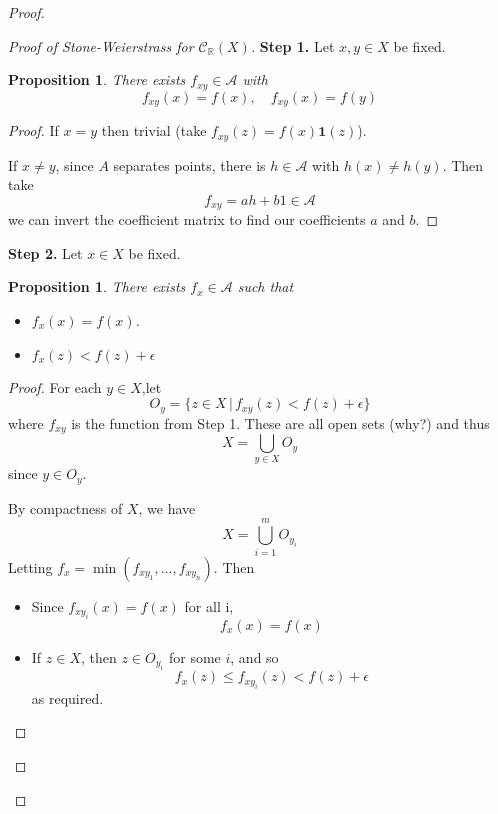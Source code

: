 \documentclass[10pt, oneside, reqno]{amsart}
\theoremstyle{plain}%
\newtheorem{prop}[thm]{Proposition}
\theoremstyle{definition}
\theoremstyle{remark}
\newcommand{\R}{\mathbb{R}}
\begin{document}
\begin{proof}
\begin{proof}[Proof of Stone-Weierstrass for $\mathcal{C}_\R(X)$]
        \textbf{Step 1.}  Let $x,y \in X$ be fixed.  
        \begin{prop}
            There exists $f_{xy} \in \mathcal{A}$ with \[
                f_{xy}(x) = f(x), \quad f_{xy}(x) = f(y)
            \]
        \end{prop}
        \begin{proof}
            If $x = y$ then trivial (take $f_{xy}(z) = f(x) \mathbf{1}(z)$). 
            
            If $x \neq y$, since $A$ separates points, there is $h \in \mathcal{A}$ with $h(x) \neq h(y)$.  Then take \[
                f_{xy} = a h + b 1 \in \mathcal{A}
            \] we can invert the coefficient matrix to find our coefficients $a$ and $b$.  
        \end{proof}
        
        \textbf{Step 2.} Let $x \in X$ be fixed.  
        \begin{prop}
            There exists $f_x \in \mathcal{A}$ such that \begin{itemize}
                \item $f_x(x) = f(x)$.  
                \item $f_x(z) < f(z) + \epsilon$
            \end{itemize}
        \end{prop}
        \begin{proof}
            For each $y \in X$,let \[
                O_y = \{ z \in X \, | \, f_{xy}(z) < f(z) + \epsilon \}
            \] where $f_{xy}$ is the function from Step 1.  These are all open sets (why?) and thus \[
                X = \bigcup_{y \in X} O_y
            \] since $y \in O_y$.  
            
            By compactness of $X$, we have \[
                X = \bigcup_{i=1}^m O_{y_i}
            \]  Letting $f_x = \min(f_{xy_1}, \dots, f_{xy_n})$.  Then 
            \begin{itemize}
                \item Since $f_{xy_i}(x) = f(x)$ for all i, \[
                    f_x(x) = f(x)
                \]
                \item If $z \in X$, then $z \in O_{y_i}$ for some $i$, and so \[
                    f_x(z) \leq f_{x y_i}(z) < f(z) + \epsilon
                \] as required.
            \end{itemize} 
        \end{proof}
        

\end{proof}
\end{proof}
\end{document}
